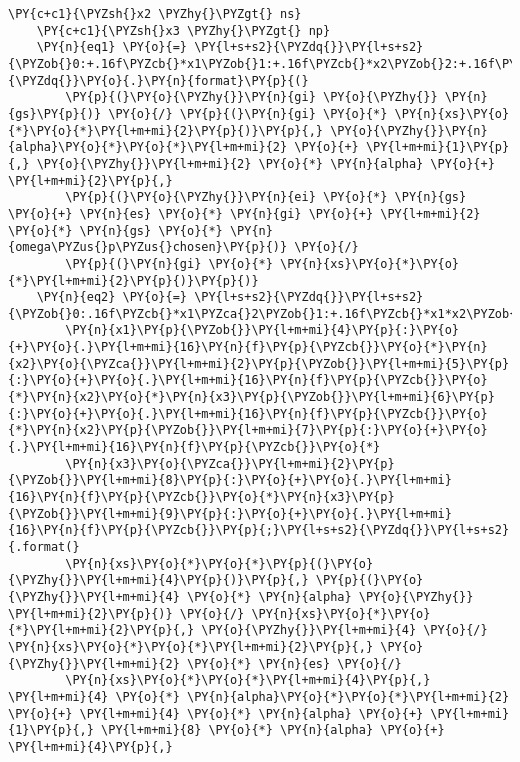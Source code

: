 \begin{Verbatim}[commandchars=\\\{\}]
    \PY{c+c1}{\PYZsh{}x2 \PYZhy{}\PYZgt{} ns}
    \PY{c+c1}{\PYZsh{}x3 \PYZhy{}\PYZgt{} np}
    \PY{n}{eq1} \PY{o}{=} \PY{l+s+s2}{\PYZdq{}}\PY{l+s+s2}{\PYZob{}0:+.16f\PYZcb{}*x1\PYZob{}1:+.16f\PYZcb{}*x2\PYZob{}2:+.16f\PYZcb{}*x3\PYZob{}3:+.16f\PYZcb{};}\PY{l+s+s2}{\PYZdq{}}\PY{o}{.}\PY{n}{format}\PY{p}{(}
        \PY{p}{(}\PY{o}{\PYZhy{}}\PY{n}{gi} \PY{o}{\PYZhy{}} \PY{n}{gs}\PY{p}{)} \PY{o}{/} \PY{p}{(}\PY{n}{gi} \PY{o}{*} \PY{n}{xs}\PY{o}{*}\PY{o}{*}\PY{l+m+mi}{2}\PY{p}{)}\PY{p}{,} \PY{o}{\PYZhy{}}\PY{n}{alpha}\PY{o}{*}\PY{o}{*}\PY{l+m+mi}{2} \PY{o}{+} \PY{l+m+mi}{1}\PY{p}{,} \PY{o}{\PYZhy{}}\PY{l+m+mi}{2} \PY{o}{*} \PY{n}{alpha} \PY{o}{+} \PY{l+m+mi}{2}\PY{p}{,}
        \PY{p}{(}\PY{o}{\PYZhy{}}\PY{n}{ei} \PY{o}{*} \PY{n}{gs} \PY{o}{+} \PY{n}{es} \PY{o}{*} \PY{n}{gi} \PY{o}{+} \PY{l+m+mi}{2} \PY{o}{*} \PY{n}{gs} \PY{o}{*} \PY{n}{omega\PYZus{}p\PYZus{}chosen}\PY{p}{)} \PY{o}{/}
        \PY{p}{(}\PY{n}{gi} \PY{o}{*} \PY{n}{xs}\PY{o}{*}\PY{o}{*}\PY{l+m+mi}{2}\PY{p}{)}\PY{p}{)}
    \PY{n}{eq2} \PY{o}{=} \PY{l+s+s2}{\PYZdq{}}\PY{l+s+s2}{\PYZob{}0:.16f\PYZcb{}*x1\PYZca{}2\PYZob{}1:+.16f\PYZcb{}*x1*x2\PYZob{}2:+.16f\PYZcb{}*x1*x3\PYZob{}3:+.16f\PYZcb{}*}
        \PY{n}{x1}\PY{p}{\PYZob{}}\PY{l+m+mi}{4}\PY{p}{:}\PY{o}{+}\PY{o}{.}\PY{l+m+mi}{16}\PY{n}{f}\PY{p}{\PYZcb{}}\PY{o}{*}\PY{n}{x2}\PY{o}{\PYZca{}}\PY{l+m+mi}{2}\PY{p}{\PYZob{}}\PY{l+m+mi}{5}\PY{p}{:}\PY{o}{+}\PY{o}{.}\PY{l+m+mi}{16}\PY{n}{f}\PY{p}{\PYZcb{}}\PY{o}{*}\PY{n}{x2}\PY{o}{*}\PY{n}{x3}\PY{p}{\PYZob{}}\PY{l+m+mi}{6}\PY{p}{:}\PY{o}{+}\PY{o}{.}\PY{l+m+mi}{16}\PY{n}{f}\PY{p}{\PYZcb{}}\PY{o}{*}\PY{n}{x2}\PY{p}{\PYZob{}}\PY{l+m+mi}{7}\PY{p}{:}\PY{o}{+}\PY{o}{.}\PY{l+m+mi}{16}\PY{n}{f}\PY{p}{\PYZcb{}}\PY{o}{*}
        \PY{n}{x3}\PY{o}{\PYZca{}}\PY{l+m+mi}{2}\PY{p}{\PYZob{}}\PY{l+m+mi}{8}\PY{p}{:}\PY{o}{+}\PY{o}{.}\PY{l+m+mi}{16}\PY{n}{f}\PY{p}{\PYZcb{}}\PY{o}{*}\PY{n}{x3}\PY{p}{\PYZob{}}\PY{l+m+mi}{9}\PY{p}{:}\PY{o}{+}\PY{o}{.}\PY{l+m+mi}{16}\PY{n}{f}\PY{p}{\PYZcb{}}\PY{p}{;}\PY{l+s+s2}{\PYZdq{}}\PY{l+s+s2}{.format(}
        \PY{n}{xs}\PY{o}{*}\PY{o}{*}\PY{p}{(}\PY{o}{\PYZhy{}}\PY{l+m+mi}{4}\PY{p}{)}\PY{p}{,} \PY{p}{(}\PY{o}{\PYZhy{}}\PY{l+m+mi}{4} \PY{o}{*} \PY{n}{alpha} \PY{o}{\PYZhy{}} \PY{l+m+mi}{2}\PY{p}{)} \PY{o}{/} \PY{n}{xs}\PY{o}{*}\PY{o}{*}\PY{l+m+mi}{2}\PY{p}{,} \PY{o}{\PYZhy{}}\PY{l+m+mi}{4} \PY{o}{/} \PY{n}{xs}\PY{o}{*}\PY{o}{*}\PY{l+m+mi}{2}\PY{p}{,} \PY{o}{\PYZhy{}}\PY{l+m+mi}{2} \PY{o}{*} \PY{n}{es} \PY{o}{/}
        \PY{n}{xs}\PY{o}{*}\PY{o}{*}\PY{l+m+mi}{4}\PY{p}{,} \PY{l+m+mi}{4} \PY{o}{*} \PY{n}{alpha}\PY{o}{*}\PY{o}{*}\PY{l+m+mi}{2} \PY{o}{+} \PY{l+m+mi}{4} \PY{o}{*} \PY{n}{alpha} \PY{o}{+} \PY{l+m+mi}{1}\PY{p}{,} \PY{l+m+mi}{8} \PY{o}{*} \PY{n}{alpha} \PY{o}{+} \PY{l+m+mi}{4}\PY{p}{,}

\end{Verbatim}

